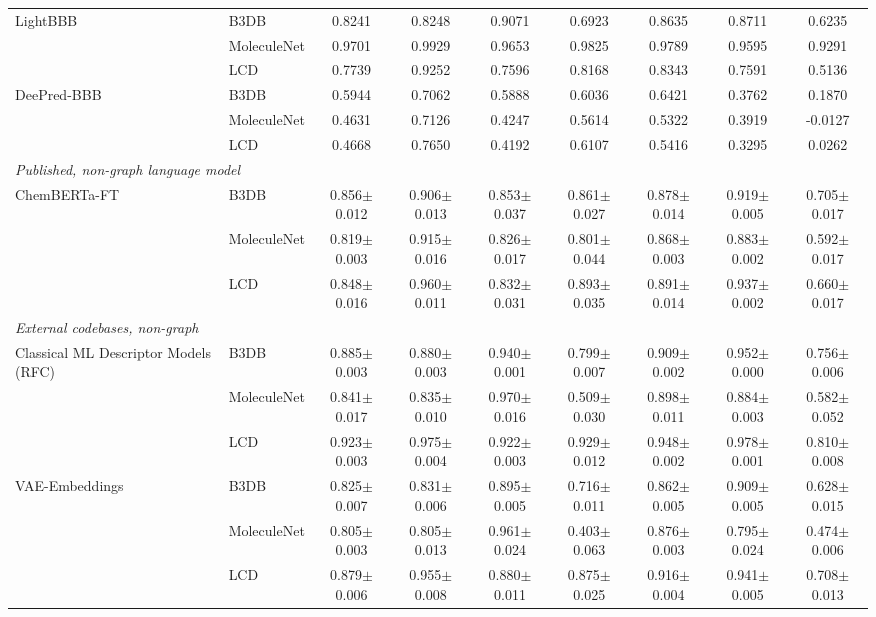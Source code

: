 \documentclass[conference]{IEEEtran}
\begin{document}
\begin{table}[htbp]
{\begin{tabular}{llccccccc}
\hline
\multirow{3}{*}{LightBBB}
    & B3DB        & 0.8241 & 0.8248 & 0.9071 & 0.6923 & 0.8635 & 0.8711 & 0.6235 \\
    & MoleculeNet & 0.9701 & 0.9929 & 0.9653 & 0.9825 & 0.9789 & 0.9595 & 0.9291 \\
    & LCD      & 0.7739 & 0.9252 & 0.7596 & 0.8168 & 0.8343 & 0.7591 & 0.5136 \\
\hline
\multirow{3}{*}{DeePred-BBB}
    & B3DB        & 0.5944 & 0.7062 & 0.5888 & 0.6036 & 0.6421 & 0.3762      & 0.1870 \\
    & MoleculeNet & 0.4631 & 0.7126 & 0.4247 & 0.5614 & 0.5322 & 0.3919      & -0.0127 \\
    & LCD      & 0.4668 & 0.7650 & 0.4192 & 0.6107 & 0.5416 & 0.3295      & 0.0262 \\
\hline
\multicolumn{9}{l}{\textit{Published, non-graph language model}} \\
\hline
\multirow{3}{*}{ChemBERTa-FT}
    & B3DB        & 0.856$\pm$0.012 & 0.906$\pm$0.013 & 0.853$\pm$0.037 & 0.861$\pm$0.027 & 0.878$\pm$0.014 & 0.919$\pm$0.005 & 0.705$\pm$0.017 \\
    & MoleculeNet & 0.819$\pm$0.003 & 0.915$\pm$0.016 & 0.826$\pm$0.017 & 0.801$\pm$0.044 & 0.868$\pm$0.003 & 0.883$\pm$0.002 & 0.592$\pm$0.017 \\
    & LCD      & 0.848$\pm$0.016 & 0.960$\pm$0.011 & 0.832$\pm$0.031 & 0.893$\pm$0.035 & 0.891$\pm$0.014 & 0.937$\pm$0.002 & 0.660$\pm$0.017 \\
\hline
\multicolumn{9}{l}{\textit{External codebases, non-graph}} \\
\hline
\multirow{3}{*}{Classical ML Descriptor Models (RFC)}
    & B3DB        & 0.885$\pm$0.003 & 0.880$\pm$0.003 & 0.940$\pm$0.001 & 0.799$\pm$0.007 & 0.909$\pm$0.002 & 0.952$\pm$0.000 & 0.756$\pm$0.006 \\
    & MoleculeNet & 0.841$\pm$0.017 & 0.835$\pm$0.010 & 0.970$\pm$0.016 & 0.509$\pm$0.030 & 0.898$\pm$0.011 & 0.884$\pm$0.003 & 0.582$\pm$0.052 \\
    & LCD      & 0.923$\pm$0.003 & 0.975$\pm$0.004 & 0.922$\pm$0.003 & 0.929$\pm$0.012 & 0.948$\pm$0.002 & 0.978$\pm$0.001 & 0.810$\pm$0.008 \\
\hline
\multirow{3}{*}{VAE-Embeddings}
    & B3DB        & 0.825$\pm$0.007 & 0.831$\pm$0.006 & 0.895$\pm$0.005 & 0.716$\pm$0.011 & 0.862$\pm$0.005 & 0.909$\pm$0.005 & 0.628$\pm$0.015 \\
    & MoleculeNet & 0.805$\pm$0.003 & 0.805$\pm$0.013 & 0.961$\pm$0.024 & 0.403$\pm$0.063 & 0.876$\pm$0.003 & 0.795$\pm$0.024 & 0.474$\pm$0.006 \\
    & LCD      & 0.879$\pm$0.006 & 0.955$\pm$0.008 & 0.880$\pm$0.011 & 0.875$\pm$0.025 & 0.916$\pm$0.004 & 0.941$\pm$0.005 & 0.708$\pm$0.013 \\
\hline
\end{tabular}
}


\end{table}
\end{document}
